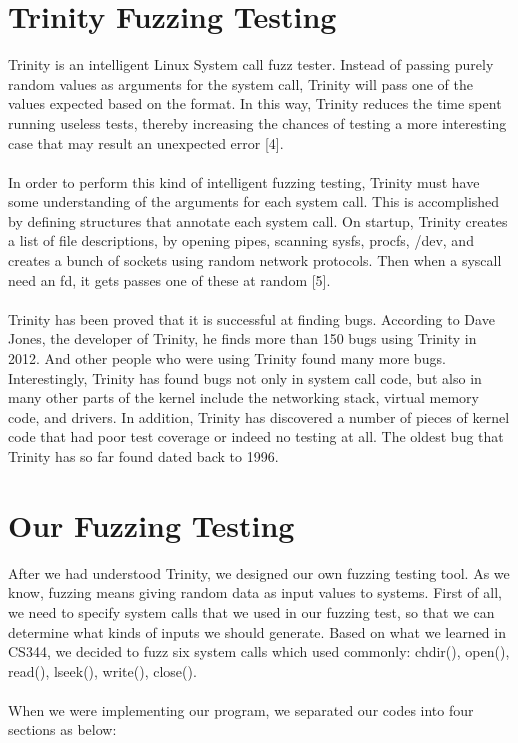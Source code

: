\documentclass[twoside]{article}
\begin{document}
\begin{multicols}{2}


\section{Trinity Fuzzing Testing}
Trinity is an intelligent Linux System call fuzz tester. Instead of passing purely random values as arguments for the system call, Trinity will pass one of the values expected based on the format. In this way, Trinity reduces the time spent running useless tests, thereby increasing the chances of testing a more interesting case that may result an unexpected error [4].
\\\\
\noindent
In order to perform this kind of intelligent fuzzing testing, Trinity must have some understanding of the arguments for each system call. This is accomplished by defining structures that annotate each system call. On startup, Trinity creates a list of file descriptions, by opening pipes, scanning sysfs, procfs, /dev, and creates a bunch of sockets using random network protocols. Then when a syscall need an fd, it gets passes one of these at random [5].
\\\\
\noindent
Trinity has been proved that it is successful at finding bugs. According to Dave Jones, the developer of Trinity, he finds more than 150 bugs using Trinity in 2012. And other people who were using Trinity found many more bugs. Interestingly, Trinity has found bugs not only in system call code, but also in many other parts of the kernel include the networking stack, virtual memory code, and drivers. In addition, Trinity has discovered a number of pieces of kernel code that had poor test coverage or indeed no testing at all. The oldest bug that Trinity has so far found dated back to 1996.

\section{Our Fuzzing Testing}
After we had understood Trinity, we designed our own fuzzing testing tool. As we know, fuzzing means giving random data as input values to systems. First of all, we need to specify system calls that we used in our fuzzing test, so that we can determine what kinds of inputs we should generate. Based on what we learned in CS344, we decided to fuzz six system calls which used commonly: chdir(), open(), read(), lseek(), write(), close(). 
\\\\
\noindent
When we were implementing our program, we separated our codes into four sections as below:
\begin{enumerate}


\end{enumerate}
\end{multicols}
\end{document}
